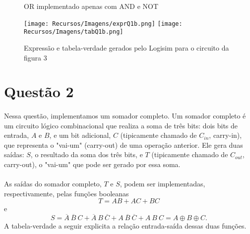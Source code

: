 \documentclass[a4paper, 12pt]{article}
\begin{document}
\begin{figure}[H]
    \centering
    
    \vspace{-30pt}
    \caption{OR implementado apenas com AND e NOT}
\end{figure}

\begin{figure}[H]
    \centering
    \texttt{[image: Recursos/Imagens/exprQ1b.png]}
    \texttt{[image: Recursos/Imagens/tabQ1b.png]} \\
    \caption{Expressão e tabela-verdade gerados pelo Logisim para o circuito da figura 3}
\end{figure}

\section{Questão 2}
\paragraph{}
Nessa questão, implementamos um somador completo. Um somador completo é um circuito lógico combinacional que realiza a soma de três bits: dois bits de entrada, $A$ e $B$, e um bit adicional, $C$ (tipicamente chamado de $C_{in}$, carry-in), que representa o "vai-um" (carry-out) de uma operação anterior. Ele gera duas saídas: $S$, o resultado da soma dos três bits, e $T$ (tipicamente chamado de $C_{out}$, carry-out), o "vai-um" que pode ser gerado por essa soma.
\paragraph{}
As saídas do somador completo, $T$ e $S$, podem ser implementadas, respectivamente, pelas funções booleanas
\[T = AB + AC + BC\] e \[S = \overline{A} \ \overline{B} \ C + \overline{A} \ B \ \overline{C} + A \ \overline{B} \ \overline{C} + A \ B \ C = A \oplus B \oplus C.\] A tabela-verdade a seguir explicita a relação entrada-saída dessas duas funções.
\end{document}
